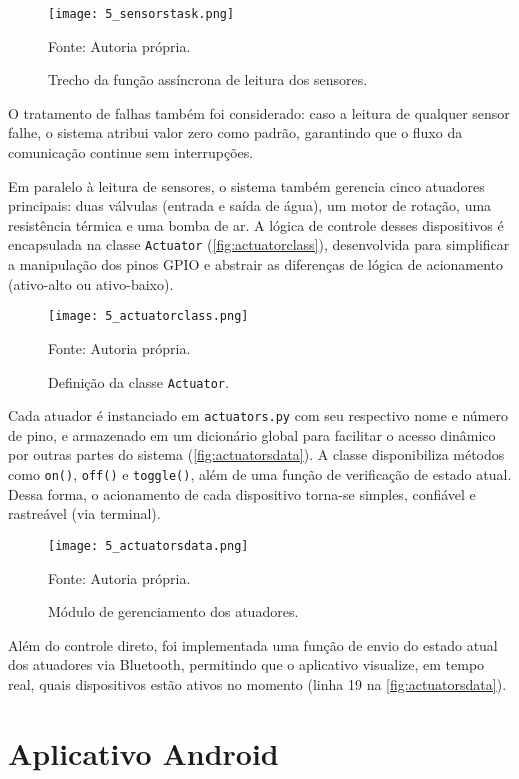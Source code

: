 \begin{figure}[ht]
    \centering
    \caption{Trecho da função assíncrona de leitura dos sensores.}
    \label{fig:sensorstask}
    \texttt{[image: 5\_sensorstask.png]}

    {\centering\footnotesize Fonte: Autoria própria.\par}
\end{figure}

O tratamento de falhas também foi considerado: caso a leitura de qualquer sensor falhe, o sistema atribui valor zero como padrão, garantindo que o fluxo da comunicação continue sem interrupções.

Em paralelo à leitura de sensores, o sistema também gerencia cinco atuadores principais: duas válvulas (entrada e saída de água), um motor de rotação, uma resistência térmica e uma bomba de ar. A lógica de controle desses dispositivos é encapsulada na classe \texttt{Actuator} (\autoref{fig:actuatorclass}), desenvolvida para simplificar a manipulação dos pinos GPIO e abstrair as diferenças de lógica de acionamento (ativo-alto ou ativo-baixo).

\begin{figure}[ht]
    \centering
    \caption{Definição da classe \texttt{Actuator}.}
    \label{fig:actuatorclass}
    \texttt{[image: 5\_actuatorclass.png]}

    {\centering\footnotesize Fonte: Autoria própria.\par}
\end{figure}

Cada atuador é instanciado em \texttt{actuators.py} com seu respectivo nome e número de pino, e armazenado em um dicionário global para facilitar o acesso dinâmico por outras partes do sistema (\autoref{fig:actuatorsdata}). A classe disponibiliza métodos como \texttt{on()}, \texttt{off()} e \texttt{toggle()}, além de uma função de verificação de estado atual. Dessa forma, o acionamento de cada dispositivo torna-se simples, confiável e rastreável (via terminal).

\begin{figure}[ht]
    \centering
    \caption{Módulo de gerenciamento dos atuadores.}
    \label{fig:actuatorsdata}
    \texttt{[image: 5\_actuatorsdata.png]}

    {\centering\footnotesize Fonte: Autoria própria.\par}
\end{figure}

Além do controle direto, foi implementada uma função de envio do estado atual dos atuadores via Bluetooth, permitindo que o aplicativo visualize, em tempo real, quais dispositivos estão ativos no momento (linha 19 na \autoref{fig:actuatorsdata}).

\section{Aplicativo Android}

